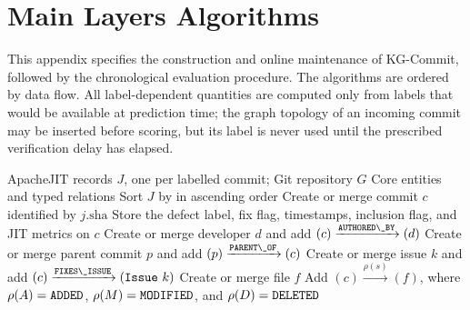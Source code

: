 \documentclass[final,5p,times,twocolumn]{elsarticle}
\DeclareRobustCommand{\code}[1]{%
  \ifmmode
    \text{\normalfont\ttfamily\detokenize{#1}}%
  \else
    {\normalfont\ttfamily\detokenize{#1}}%
  \fi
}
\DeclareRobustCommand{\edge}[1]{\code{#1}}
\DeclareRobustCommand{\node}[1]{\code{#1}}
\theoremstyle{plain}
\begin{document}
\FloatBarrier
\section{Main Layers Algorithms}
\label{app:algorithms}

This appendix specifies the construction and online maintenance of KG-Commit,
followed by the chronological evaluation procedure. The algorithms are ordered
by data flow. All label-dependent quantities are computed only from labels that
would be available at prediction time; the graph topology of an incoming commit
may be inserted before scoring, but its label is never used until the prescribed
verification delay has elapsed.


\begin{algorithm}[!htbp]
\caption{Construction of the Core process layer}
\label{alg:core}
\small
\begin{algorithmic}[1]
\Require ApacheJIT records $J$, one per labelled commit; Git repository $G$
\Ensure Core entities and typed relations
\State Sort $J$ by \code{author\_ts} in ascending order
  \State Create or merge commit $c$ identified by $j.\mathrm{sha}$
  \State Store the defect label, fix flag, timestamps, inclusion flag, and JIT metrics on $c$
  \State Create or merge developer $d$ and add $(c)\xrightarrow{\edge{AUTHORED\_BY}}(d)$
    \State Create or merge parent commit $p$ and add $(p)\xrightarrow{\edge{PARENT\_OF}}(c)$
  \EndFor
    \State Create or merge issue $k$ and add $(c)\xrightarrow{\edge{FIXES\_ISSUE}}(\node{Issue}\ k)$
  \EndFor
    \State Create or merge file $f$
    \State Add $(c)\xrightarrow{\rho(s)}(f)$, where
      $\rho(A)=\edge{ADDED}$, $\rho(M)=\edge{MODIFIED}$, and $\rho(D)=\edge{DELETED}$
  \EndFor
\EndFor
\end{algorithmic}
\end{algorithm}
\end{document}
